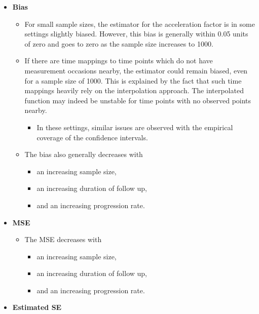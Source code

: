 \documentclass[
]{article}
\providecommand{\tightlist}{%
  \setlength{\itemsep}{0pt}\setlength{\parskip}{0pt}}
\begin{document}
\begin{itemize}
\tightlist
\item
  \textbf{Bias}

  \begin{itemize}
  \tightlist
  \item
    For small sample sizes, the estimator for the acceleration factor is in some
    settings slightly biased. However, this bias is generally within 0.05 units of
    zero and goes to zero as the sample size increases to 1000.
  \item
    If there are time mappings to time points which do not have measurement occasions nearby,
    the estimator could remain biased, even for a sample size of 1000. This is
    explained by the fact that such time mappings heavily rely on the
    interpolation approach. The interpolated function may indeed be unstable for time
    points with no observed points nearby.

    \begin{itemize}
    \tightlist
    \item
      In these settings, similar issues are observed with the empirical coverage of
      the confidence intervals.
    \end{itemize}
  \item
    The bias also generally decreases with

    \begin{itemize}
    \tightlist
    \item
      an increasing sample size,
    \item
      an increasing duration of follow up,
    \item
      and an increasing progression rate.
    \end{itemize}
  \end{itemize}
\item
  \textbf{MSE}

  \begin{itemize}
  \tightlist
  \item
    The MSE decreases with

    \begin{itemize}
    \tightlist
    \item
      an increasing sample size,
    \item
      an increasing duration of follow up,
    \item
      and an increasing progression rate.
    \end{itemize}
  \end{itemize}
\item
  \textbf{Estimated SE}


\end{itemize}
\end{document}
